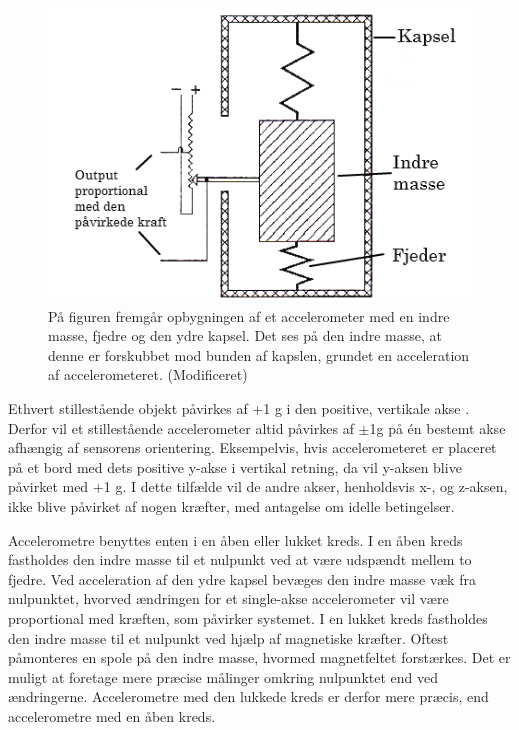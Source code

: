 \begin{figure}[H]
	\centering
	\includegraphics[scale=0.5]{figures/bProblemloesning/accelerometer_basic.png}
	\caption{På figuren fremgår opbygningen af et accelerometer med en indre masse, fjedre og den ydre kapsel. Det ses på den indre masse, at denne er forskubbet mod bunden af kapslen, grundet en acceleration af accelerometeret. \citep{TittertonWeston2004} (Modificeret)}
	\label{acc_simpelt}
\end{figure}
Ethvert stillestående objekt påvirkes af +1 g i den positive, vertikale akse \citep{Serway2010}. Derfor vil et stillestående accelerometer altid påvirkes af $\pm$1g på én bestemt akse afhængig af sensorens orientering. Eksempelvis, hvis accelerometeret er placeret på et bord med dets positive y-akse i vertikal retning, da vil y-aksen blive påvirket med $+$1 g. I dette tilfælde vil de andre akser, henholdsvis x-, og z-aksen, ikke blive påvirket af nogen kræfter, med antagelse om idelle betingelser. 

Accelerometre benyttes enten i en åben eller lukket kreds. I en åben kreds fastholdes den indre masse til et nulpunkt ved at være udspændt mellem to fjedre. Ved acceleration af den ydre kapsel bevæges den indre masse væk fra nulpunktet, hvorved ændringen for et single-akse accelerometer vil være proportional med kræften, som påvirker systemet. \newline
I en lukket kreds fastholdes den indre masse til et nulpunkt ved hjælp af magnetiske kræfter. Oftest påmonteres en spole på den indre masse, hvormed magnetfeltet forstærkes. Det er muligt at foretage mere præcise målinger omkring nulpunktet end ved ændringerne. Accelerometre med den lukkede kreds er derfor mere præcis, end accelerometre med en åben kreds. \citep{TittertonWeston2004,Academic2016d,Serway2010}
